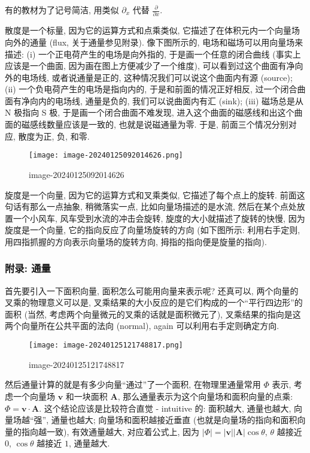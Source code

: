 \begin{newquote}
有的教材为了记号简洁, 用类似 \(\partial_x\) 代替
\(\frac{\partial}{\partial x}\).
\end{newquote}

散度是一个标量, 因为它的运算方式和点乘类似,
它描述了在体积元内一个向量场向外的通量 (flux, 关于通量参见附录).
像下图所示的, 电场和磁场可以用向量场来描述: (i)
一个正电荷产生的电场是向外指的, 于是画一个任意的闭合曲线
(事实上应该是一个曲面, 因为画在图上方便减少了一个维度),
可以看到过这个曲面有净向外的电场线, 或者说通量是正的,
这种情况我们可以说这个曲面内有源 (source); (ii)
一个负电荷产生的电场是指向内的, 于是和前面的情况正好相反,
过一个闭合曲面有净向内的电场线, 通量是负的, 我们可以说曲面内有汇 (sink);
(iii) 磁场总是从 N 极指向 S 极, 于是画一个闭合曲面不难发现,
进入这个曲面的磁感线和出这个曲面的磁感线数量应该是一致的,
也就是说磁通量为零. 于是, 前面三个情况分别对应, 散度为正, 负, 和零.

\begin{figure}
\centering
\texttt{[image: image-20240125092014626.png]}
\caption{image-20240125092014626}
\end{figure}

旋度是一个向量, 因为它的运算方式和叉乘类似, 它描述了每个点上的旋转.
前面这句话有那么一点抽象, 稍微落实一点, 比如向量场描述的是水流,
然后在某个点处放置一个小风车, 风车受到水流的冲击会旋转,
旋度的大小就描述了旋转的快慢, 因为旋度是一个向量,
它的指向反应了向量场旋转的方向 (如下图所示: 利用右手定则,
用四指抓握的方向表示向量场的旋转方向, 拇指的指向便是旋量的指向).

\subsubsection{附录: 通量}

首先要引入一下面积向量, 面积怎么可能用向量来表示呢? 还真可以,
两个向量的叉乘的物理意义可以是,
叉乘结果的大小反应的是它们构成的一个``平行四边形''的面积 (当然,
考虑两个向量微元的叉乘的话就是面积微元了),
叉乘结果的指向是这两个向量所在公共平面的法向 (normal), again
可以利用右手定则确定方向.

\begin{figure}
\centering
\texttt{[image: image-20240125121748817.png]}
\caption{image-20240125121748817}
\end{figure}

然后通量计算的就是有多少向量``通过''了一个面积, 在物理里通量常用
\(\Phi\) 表示, 考虑一个向量场 \(\boldsymbol{v}\) 和一块面积
\(\boldsymbol{A}\), 那么通量表示为这个向量场和面积向量的点乘:
\(\Phi=\boldsymbol{v}\cdot\boldsymbol{A}\). 这个结论应该是比较符合直觉 -
intuitive 的: 面积越大, 通量也越大, 向量场越``强'', 通量也越大;
向量场和面积越接近垂直 (也就是向量场的指向和面积向量的指向越一致),
有效通量越大, 对应着公式上, 因为
\(|\Phi|=|\boldsymbol{v}||\boldsymbol{A}|\cos\theta\), \(\theta\) 越接近
\(0\), \(\cos\theta\) 越接近 \(1\), 通量越大.
